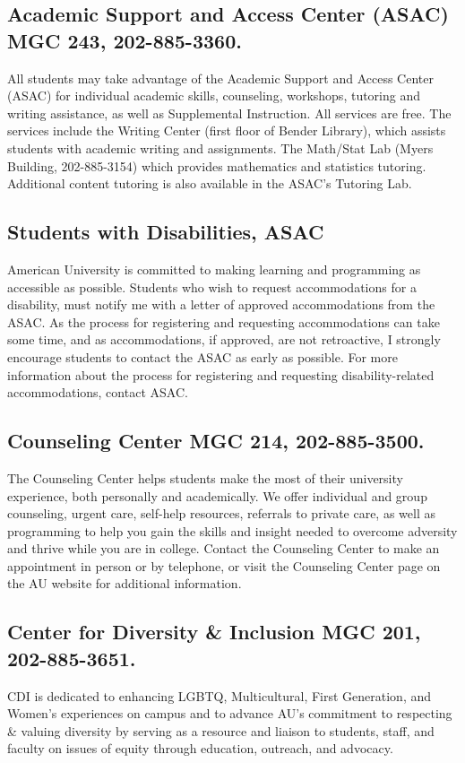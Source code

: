 \subsection{Academic Support and Access Center (ASAC) MGC 243,
202-885-3360.} All students may take advantage of the Academic
Support and Access Center (ASAC) for individual academic skills,
counseling, workshops, tutoring and writing assistance, as well
as Supplemental Instruction. All services are free. The services
include the Writing Center (first floor of Bender Library), which
assists students with academic writing and assignments. The
Math/Stat Lab (Myers Building, 202-885-3154) which provides
mathematics and statistics tutoring. Additional content tutoring
is also available in the ASAC's Tutoring Lab.

\subsection{Students with Disabilities, ASAC} American University
is committed to making learning and programming as accessible as
possible. Students who wish to request accommodations for a
disability, must notify me with a letter of approved
accommodations from the ASAC. As the process for registering and
requesting accommodations can take some time, and as
accommodations, if approved, are not retroactive, I strongly
encourage students to contact the ASAC as early as possible. For
more information about the process for registering and requesting
disability-related accommodations, contact ASAC.

\subsection{Counseling Center MGC 214, 202-885-3500.} The
Counseling Center helps students make the most of their
university experience, both personally and academically. We offer
individual and group counseling, urgent care, self-help
resources, referrals to private care, as well as programming to
help you gain the skills and insight needed to overcome adversity
and thrive while you are in college. Contact the Counseling
Center to make an appointment in person or by telephone, or visit
the Counseling Center page on the AU website for additional
information.

\subsection{Center for Diversity \& Inclusion MGC 201,
202-885-3651.} CDI is dedicated to enhancing LGBTQ,
Multicultural, First Generation, and Women's experiences on
campus and to advance AU's commitment to respecting \& valuing
diversity by serving as a resource and liaison to students,
staff, and faculty on issues of equity through education,
outreach, and advocacy.

